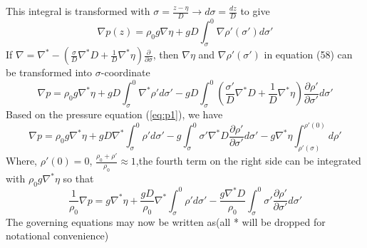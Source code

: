 \documentclass[oribibl]{llncs}
\begin{document}
This integral is transformed with $\sigma=\frac{z-\eta}{D} \rightarrow d\sigma=\frac{dz}{D} $ to give
\begin{equation}
\nabla p(z) = \rho_0 g \nabla\eta +g D\int_\sigma^0 \nabla\rho'(\sigma') d\sigma'
\end{equation}
If $\nabla = \nabla^* -\left( \frac{\sigma}{D}\nabla^*D +\frac{1}{D}\nabla^*\eta \right)\frac{\partial}{\partial \sigma}$, then $\nabla\eta$ and $\nabla\rho'(\sigma')$ in equation (58) can be transformed into $\sigma$-coordinate 
\begin{equation}\label{eq:p1}
\nabla p = \rho_0 g \nabla^*\eta  + g D\int_\sigma^0 \nabla^* \rho' d\sigma' - gD \int_\sigma^0(\frac{\sigma'}{D}\nabla^*D +\frac{1}{D}\nabla^*\eta) \frac{\partial \rho'}{\partial \sigma'} d\sigma'
\end{equation}
Based on the pressure equation (\ref{eq:p1}), we have 
\begin{equation}
\nabla p = \rho_0 g \nabla^* \eta  + gD\nabla^*\int_\sigma^0\rho' d\sigma' -  g\int_\sigma^0\sigma'\nabla^*D\frac{\partial \rho'}{\partial \sigma'} d\sigma'  -g\nabla^* \eta \int_{\rho'(\sigma)}^{\rho'(0)} d\rho' 
\end{equation}
Where, ${\rho'(0)=0}$, ${\frac{\rho_0+\rho'}{\rho_0} \approx 1}$,the fourth term on the right side can be integrated with ${\rho_0g \nabla^*\eta}$ so that
\begin{equation}
\frac{1}{\rho_0}\nabla p = g \nabla^* \eta  +\frac{gD}{\rho_0}\nabla^*\int_\sigma^0\rho'd\sigma'  -\frac{g\nabla^*D}{\rho_0}\int_\sigma^0\sigma'\frac{\partial \rho'}{\partial \sigma'} d\sigma'
\end{equation}
The governing equations may now be written as(all * will be dropped for notational convenience)
\end{document}
